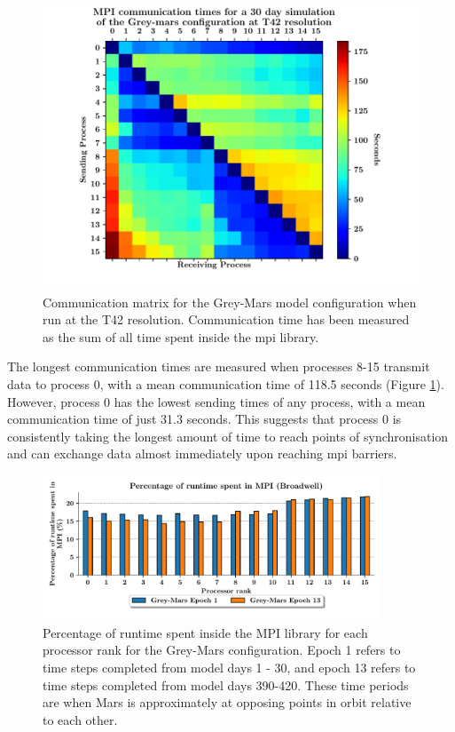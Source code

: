 \documentclass[a4paper,11pt]{report}
\begin{document}
\begin{figure}[htbp]
\begin{center}
\includegraphics[width=1\textwidth]{img/comm_mat_grey-mars.pdf}
\caption[Communication matrix for the Grey-Mars model configuration]{Communication matrix for the Grey-Mars model configuration when run at the T42 resolution. Communication time has been measured as the sum of all time spent inside the \gls{mpi} library.}
\label{fig:comm_mat}
\end{center}
\end{figure}
\par
The longest communication times are measured when processes 8-15 transmit data to process 0, with a mean communication time of 118.5 seconds (Figure \ref{fig:comm_mat}). However, process 0 has the lowest sending times of any process, with a mean communication time of just 31.3 seconds. This suggests that process 0 is consistently taking the longest amount of time to reach points of synchronisation and can exchange data almost immediately upon reaching \gls{mpi} barriers. 
\par
\begin{figure}[htbp]
\begin{center}
\includegraphics[width=0.9\textwidth]{img/mpi-barrier-time-grey-mars.pdf}
\caption[Percentage of runtime spent in the MPI library]{Percentage of runtime spent inside the MPI library for each processor rank for the Grey-Mars configuration. Epoch 1 refers to time steps completed from model days 1 - 30, and epoch 13 refers to time steps completed from model days 390-420. These time periods are when Mars is approximately at opposing points in orbit relative to each other.}
\label{fig:grey-mars-comms}
\end{center}
\end{figure}
\end{document}
